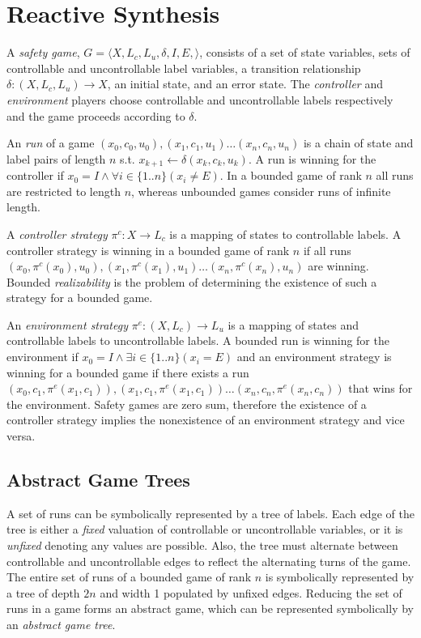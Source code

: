 \documentclass{llncs}
\begin{document}
\section{Reactive Synthesis}

A \emph{safety game}, $G = \langle X, L_c, L_u, \delta, I, E, \rangle$,
consists of a set of state variables, sets of controllable and uncontrollable
label variables, a transition relationship $\delta : (X, L_c, L_u) \to X$, an
initial state, and an error state. The \emph{controller} and \emph{environment}
players choose controllable and uncontrollable labels respectively and the game
proceeds according to $\delta$. 

An \emph{run} of a game $(x_0, c_0, u_0), (x_1, c_1, u_1) \dots (x_n, c_n,
u_n)$ is a chain of state and label pairs of length $n$ s.t.  $x_{k+1}
\leftarrow \delta(x_k, c_k, u_k)$. A run is winning for the controller if $x_0
= I \land \forall i \in \{1..n\} (x_i \neq E)$. In a bounded game of rank $n$
all runs are restricted to length $n$, whereas unbounded games consider runs of
infinite length.

A \emph{controller strategy} $\pi^c : X \to L_c$ is a mapping of states to
controllable labels. A controller strategy is winning in a bounded game of rank
$n$ if all runs $(x_0, \pi^c(x_0), u_0), (x_1, \pi^c(x_1), u_1) \dots (x_n,
\pi^c(x_n), u_n)$ are winning. Bounded \emph{realizability} is the problem of
determining the existence of such a strategy for a bounded game.

An \emph{environment strategy} $\pi^e : (X, L_c) \to L_u$ is a mapping of
states and controllable labels to uncontrollable labels. A bounded run is
winning for the environment if $x_0 = I \land \exists i \in \{1..n\} (x_i = E)$
and an environment strategy is winning for a bounded game if there exists a run
$(x_0, c_1, \pi^e(x_1, c_1)), (x_1, c_1, \pi^e(x_1, c_1)) \dots (x_n, c_n,
\pi^e(x_n, c_n))$ that wins for the environment. Safety games are zero sum,
therefore the existence of a controller strategy implies the nonexistence of an
environment strategy and vice versa.

\subsection{Abstract Game Trees}

A set of runs can be symbolically represented by a tree of labels. Each edge of
the tree is either a \emph{fixed} valuation of controllable or uncontrollable
variables, or it is \emph{unfixed} denoting any values are possible. Also, the
tree must alternate between controllable and uncontrollable edges to reflect
the alternating turns of the game. The entire set of runs of a bounded game of
rank $n$ is symbolically represented by a tree of depth $2n$ and width 1
populated by unfixed edges. Reducing the set of runs in a game forms an
abstract game, which can be represented symbolically by an \emph{abstract game
tree}.
\end{document}
